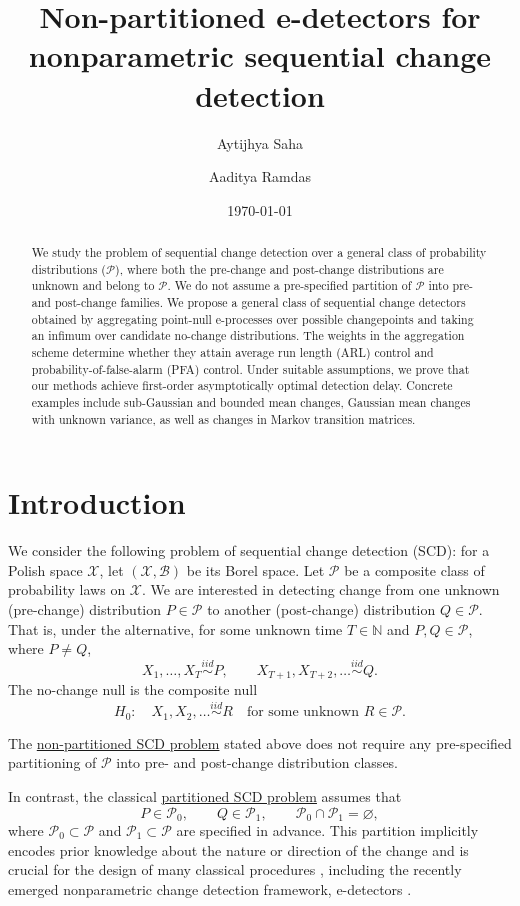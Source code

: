 \documentclass[12pt]{article}
\title{Non-partitioned e-detectors for nonparametric sequential change detection}
\author[1]{Aytijhya Saha}
\author[2]{Aaditya Ramdas}
\affil[1]{Massachusetts Institute of Technology.  \texttt{aytijhya@mit.edu}}
\affil[2]{Carnegie Mellon University. \texttt{aramdas@cmu.edu}}
\date{\today}
\theoremstyle{spaced}
\theoremstyle{remark}
\newcommand{\calP}{\mathcal P}
\newcommand{\calX}{\mathcal X}
\begin{document}
\maketitle

\begin{abstract}
We study the problem of sequential change detection over a general class of probability distributions ($\mathcal P$), where both the pre-change and post-change distributions are unknown and belong to $\mathcal P$. We do not assume a pre-specified partition of $\mathcal P$ into pre- and post-change families. We propose a general class of sequential change detectors obtained by aggregating point-null e-processes over possible changepoints and taking an infimum over candidate no-change distributions. The weights in the aggregation scheme determine whether they attain average run length (ARL) control and probability-of-false-alarm (PFA) control. Under suitable assumptions, we prove that our methods achieve first-order asymptotically optimal detection delay. Concrete examples include sub-Gaussian and bounded mean changes, Gaussian mean changes with unknown variance, as well as changes in
Markov transition matrices. 
\end{abstract}

\section{Introduction}
We consider the following problem of sequential change detection (SCD): for a Polish space $\mathcal{X}$, let $(\calX,\mathcal B)$ be its Borel space. Let $\calP$ be a composite class of probability laws on $\calX$. We are interested in detecting change from one unknown (pre-change) distribution $P\in\calP$ to another (post-change) distribution $Q\in\calP$. That is, under the alternative, for some unknown time $T\in\mathbb N$ and $P,Q\in\calP$,  where $P \neq Q$,
\[
  X_1,\ldots,X_T\stackrel{iid}{\sim} P,
  \qquad
  X_{T+1},X_{T+2},\ldots\stackrel{iid}{\sim} Q.
\]
The no-change null is the composite null
\[
  H_0:\quad X_1,X_2,\ldots\stackrel{iid}{\sim} R
  \quad\text{for some unknown }R\in\calP.
\]

The \underline{non-partitioned SCD problem} stated above does not require any pre-specified partitioning of $\calP$ into
pre- and post-change distribution classes. 

In contrast, the classical \underline{partitioned SCD problem} assumes that \[ P\in\calP_0, \qquad Q\in\calP_1, \qquad \calP_0\cap\calP_1=\varnothing, \] where $\calP_0\subset \calP$ and $\calP_1\subset \calP$ are specified in advance. This partition implicitly encodes prior knowledge about the nature or direction of the change and is crucial for the design of many classical procedures \citep{shiryaev1963optimum,roberts1966comparison,siegmund1995using}, including the recently emerged nonparametric change detection framework, e-detectors \citep{shin2022detectors}. 
\end{document}
